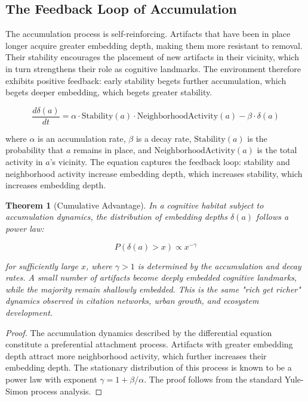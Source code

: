 \documentclass[12pt,oneside]{article}
\newtheorem{theorem}[definition]{Theorem}
\theoremstyle{remark}
\begin{document}
\subsection{The Feedback Loop of Accumulation}

The accumulation process is self-reinforcing. Artifacts that have been in place longer acquire greater embedding depth, making them more resistant to removal. Their stability encourages the placement of new artifacts in their vicinity, which in turn strengthens their role as cognitive landmarks. The environment therefore exhibits positive feedback: early stability begets further accumulation, which begets deeper embedding, which begets greater stability.

\begin{equation}
\frac{d\delta(a)}{dt} = \alpha \cdot \text{Stability}(a) \cdot \text{NeighborhoodActivity}(a) - \beta \cdot \delta(a)
\end{equation}

where $\alpha$ is an accumulation rate, $\beta$ is a decay rate, $\text{Stability}(a)$ is the probability that $a$ remains in place, and $\text{NeighborhoodActivity}(a)$ is the total activity in $a$'s vicinity. The equation captures the feedback loop: stability and neighborhood activity increase embedding depth, which increases stability, which increases embedding depth.

\begin{theorem}[Cumulative Advantage]
In a cognitive habitat subject to accumulation dynamics, the distribution of embedding depths $\delta(a)$ follows a power law:

\begin{equation}
P(\delta(a) > x) \propto x^{-\gamma}
\end{equation}

for sufficiently large $x$, where $\gamma > 1$ is determined by the accumulation and decay rates. A small number of artifacts become deeply embedded cognitive landmarks, while the majority remain shallowly embedded. This is the same "rich get richer" dynamics observed in citation networks, urban growth, and ecosystem development.
\end{theorem}

\begin{proof}
The accumulation dynamics described by the differential equation constitute a preferential attachment process. Artifacts with greater embedding depth attract more neighborhood activity, which further increases their embedding depth. The stationary distribution of this process is known to be a power law with exponent $\gamma = 1 + \beta/\alpha$. The proof follows from the standard Yule-Simon process analysis.
\end{proof}
\end{document}

